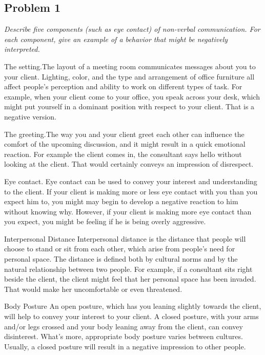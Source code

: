 \documentclass[a4paper,11pt]{article}
\begin{document}
 \subsection*{Problem 1}
 \emph{\indent Describe five components (such as eye contact) of non-verbal communication. For each component, give an example of a behavior that might be negatively interpreted.}
 \begin{paragraph}
  {The setting.}The layout of a meeting room communicates messages about you to your client. Lighting, color, and the type and arrangement of office furniture all affect people's perception and ability to work on different types of task. For example, when your client come to your office, you speak across your desk, which might put yourself in a dominant position with respect to your client. That is a negative version.
 \end{paragraph}
 \begin{paragraph}
   {The greeting.}The way you and your client greet each other can influence the comfort of the upcoming discussion, and it might result in a quick emotional reaction. For example the client comes in, the consultant says hello without looking at the client. That would certainly conveys an impression of disrespect.
 \end{paragraph}
 \begin{paragraph}
   {Eye contact.} Eye contact can be used to convey your interest and understanding to the client. If your client is making more or less eye contact with you than you expect him to, you might may begin to develop a negative reaction to him without knowing why. However, if your client is making more eye contact than you expect, you might be feeling if he is being overly aggressive.
 \end{paragraph}
\begin{paragraph}
  {Interpersonal Distance} Interpersonal distance is the distance that people will choose to stand or sit from each other, which arise from people's need for personal space. The distance is defined both by cultural norms and by the natural relationship between two people. For example, if a consultant sits right beside the client, the client might feel that her personal space has been invaded. That would make her uncomfortable or even threatened.
\end{paragraph}
\begin{paragraph}
  {Body Posture} An open posture, which has you leaning slightly towards the client, will help to convey your interest to your client. A closed posture, with your arms and/or legs crossed and your body leaning away from the client, can convey disinterest. What's more, appropriate body posture varies between cultures. Usually, a closed posture will result in a negative impression to other people.
\end{paragraph}
\end{document}
